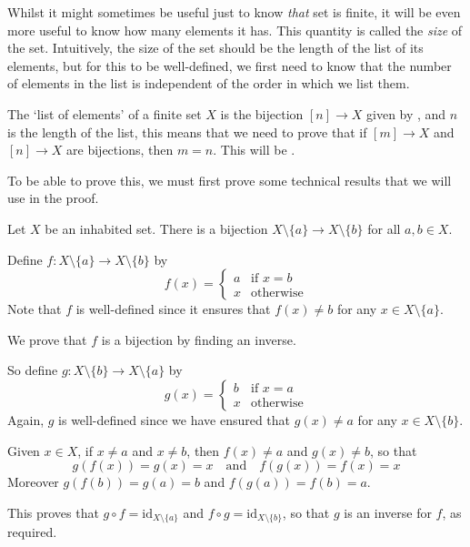 Whilst it might sometimes be useful just to know \textit{that} set is finite, it will be even more useful to know how many elements it has. This quantity is called the \textit{size} of the set. Intuitively, the size of the set should be the length of the list of its elements, but for this to be well-defined, we first need to know that the number of elements in the list is independent of the order in which we list them.

The `list of elements' of a finite set $X$ is the bijection $[n] \to X$ given by , and $n$ is the length of the list, this means that we need to prove that if $[m] \to X$ and $[n] \to X$ are bijections, then $m=n$. This will be .

To be able to prove this, we must first prove some technical results that we will use in the proof.

\begin{lemma}
\label{lemRemoveElementFromSet}
Let $X$ be an inhabited set. There is a bijection $X \setminus \{ a \} \to X \setminus \{ b \}$ for all $a, b \in X$.
\end{lemma}

\begin{cproof}
Define $f : X \setminus \{ a \} \to X \setminus \{ b \}$ by
\[ f(x) = \begin{cases} a & \text{if } x = b \\ x & \text{otherwise} \end{cases} \]
Note that $f$ is well-defined since it ensures that $f(x) \ne b$ for any $x \in X \setminus \{ a \}$.

We prove that $f$ is a bijection by finding an inverse.

So define $g : X \setminus \{ b \} \to X \setminus \{ a \}$ by
\[ g(x) = \begin{cases} b & \text{if } x = a \\ x & \text{otherwise} \end{cases} \]
Again, $g$ is well-defined since we have ensured that $g(x) \ne a$ for any $x \in X \setminus \{ b \}$.

Given $x \in X$, if $x \ne a$ and $x \ne b$, then $f(x) \ne a$ and $g(x) \ne b$, so that
\[ g(f(x)) = g(x) = x \quad \text{and} \quad f(g(x)) = f(x) = x \]
Moreover $g(f(b)) = g(a) = b$ and $f(g(a)) = f(b) = a$.

This proves that $g \circ f = \mathrm{id}_{X \setminus \{ a \}}$ and $f \circ g = \mathrm{id}_{X \setminus \{ b \}}$, so that $g$ is an inverse for $f$, as required.
\end{cproof}

